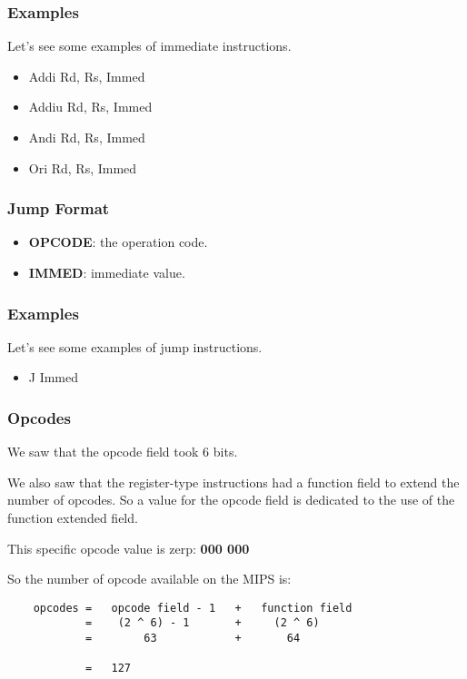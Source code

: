 
\begin{frame}[containsverbatim]
  \frametitle{Examples}

  Let's see some examples of immediate instructions.

  \begin{itemize}[<+->]
    \item
      Addi Rd, Rs, Immed
    \item
      Addiu Rd, Rs, Immed
    \item
      Andi Rd, Rs, Immed
    \item
      Ori Rd, Rs, Immed
  \end{itemize}
\end{frame}


\begin{frame}
  \frametitle{Jump Format}

  \begin{center}
  \end{center}

  \begin{itemize}[<+->]
    \item
      \textbf{OPCODE}: the operation code.
    \item
      \textbf{IMMED}: immediate value.
  \end{itemize}
\end{frame}


\begin{frame}[containsverbatim]
  \frametitle{Examples}

  Let's see some examples of jump instructions.

  \begin{itemize}[<+->]
    \item
      J Immed
  \end{itemize}
\end{frame}


\begin{frame}[containsverbatim]
  \frametitle{Opcodes}

  We saw that the opcode field took 6 bits.

  \nl

  We also saw that the register-type instructions had a function field
  to extend the number of opcodes. So a value for the opcode field is
  dedicated to the use of the function extended field.

  \nl

  This specific opcode value is zerp: \textbf{000 000}

  \nl

  So the number of opcode available on the MIPS is:

  \begin{verbatim}
    opcodes =   opcode field - 1   +   function field
            =    (2 ^ 6) - 1       +     (2 ^ 6)
            =        63            +       64

            =   127
  \end{verbatim}
\end{frame}

